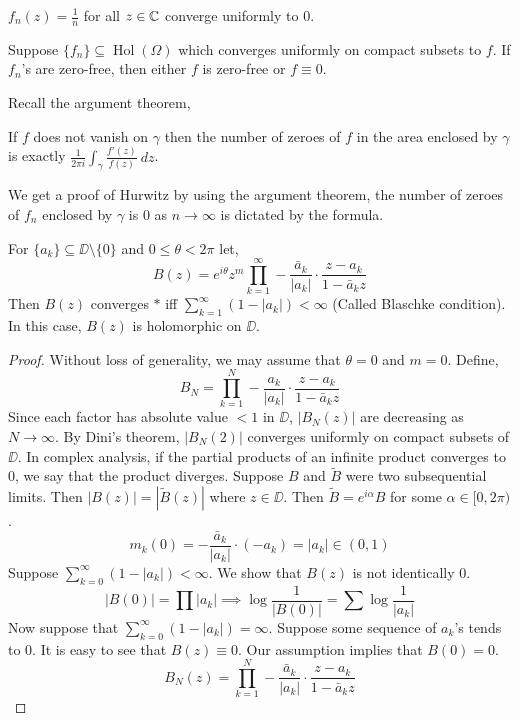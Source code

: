 \begin{exercise}
	$f_n(z) = \frac{1}{n}$ for all $z \in \mathbb{C}$ converge uniformly to $0$.
\end{exercise}
\begin{theorem}[Hurwitz]
	Suppose $\{ f_n \} \subseteq \operatorname{Hol}(\Omega)$ which converges uniformly on compact subsets to $f$.
	If $f_n$'s are zero-free, then either $f$ is zero-free or $f \equiv 0$.
\end{theorem}
Recall the argument theorem,
\begin{theorem}[Argument]
	If $f$ does not vanish on $\gamma$ then the number of zeroes of $f$ in the area enclosed by $\gamma$ is exactly $\frac{1}{2 \pi i} \int_{\gamma} \frac{f'(z)}{f(z)}\ dz$.
\end{theorem}
We get a proof of Hurwitz by using the argument theorem, the number of zeroes of $f_n$ enclosed by $\gamma$ is $0$ as $n \to \infty$ is dictated by the formula.
\begin{theorem}
	For $\{ a_k \} \subseteq \DD \setminus \{ 0 \}$ and $0 \le \theta < 2 \pi$ let,
	\[
		B(z)
		= e^{i \theta} z^m \prod_{k = 1}^\infty -\frac{\bar{a}_k}{|a_k|} \cdot \frac{z - a_k}{1 - \bar{a}_k z}
	\]
	Then $B(z)$ converges $*$ iff $\sum_{k = 1}^\infty (1 - |a_k|) < \infty$ (Called Blaschke condition).
	In this case, $B(z)$ is holomorphic on $\DD$.
\end{theorem}
\begin{proof}
	Without loss of generality, we may assume that $\theta = 0$ and $m = 0$.
	Define,
	\[
		B_N
		= \prod_{k = 1}^N -\frac{a_k}{|a_k|} \cdot \frac{z - a_k}{1 - \bar{a}_k z}
	\]
	Since each factor has absolute value $< 1$ in $\DD$, $|B_N(z)|$ are decreasing as $N \to \infty$.
	By Dini's theorem, $|B_N(2)|$ converges uniformly on compact subsets of $\DD$.
	In complex analysis, if the partial products of an infinite product converges to $0$, we say that the product diverges.
	Suppose $B$ and $\tilde{B}$ were two subsequential limits. Then $|B(z)| = |\tilde{B}(z)|$ where $z \in \DD$.
	Then $\tilde{B} = e^{i \alpha} B$ for some $\alpha \in [0, 2 \pi)$.
	\[
		m_k(0)
		= -\frac{\bar{a}_k}{|a_k|} \cdot (-a_k)
		= |a_k|
		\in (0, 1)
	\]
	Suppose $\sum_{k = 0}^\infty (1 - |a_k|) < \infty$. We show that $B(z)$ is not identically $0$.
	\[
		|B(0)|
		= \prod |a_k|
		\implies \log \frac{1}{|B(0)|}
		= \sum \log \frac{1}{|a_k|}
	\]
	Now suppose that $\sum_{k = 0}^\infty (1 - |a_k|) = \infty$.
	Suppose some sequence of $a_k$'s tends to $0$. It is easy to see that $B(z) \equiv 0$.
	Our assumption implies that $B(0) = 0$.
	\[
		B_N(z)
		= \prod_{k = 1}^N -\frac{\bar{a}_k}{|a_k|} \cdot \frac{z - a_k}{1 - \bar{a}_k z}
	\]
\end{proof}
